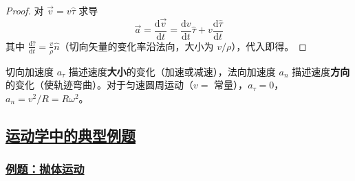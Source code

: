 \begin{proof}
    对 $\vec{v} = v\hat{\tau}$ 求导
    \begin{equation}
        \vec{a} = \frac{\mathrm{d}\vec{v}}{\mathrm{d}t} = \frac{\mathrm{d}v}{\mathrm{d}t}\hat{\tau} + v\frac{\mathrm{d}\hat{\tau}}{\mathrm{d}t}
    \end{equation}
    其中 $\frac{\mathrm{d}\hat{\tau}}{\mathrm{d}t} = \frac{v}{\rho}\hat{n}$（切向矢量的变化率沿法向，大小为 $v/\rho$），代入即得。
\end{proof}

\begin{remark}
    切向加速度 $a_\tau$ 描述速度\textbf{大小}的变化（加速或减速），法向加速度 $a_n$ 描述速度\textbf{方向}的变化（使轨迹弯曲）。对于匀速圆周运动（$v = $ 常量），$a_\tau = 0$，$a_n = v^2/R = R\omega^2$。
\end{remark}

\subsection{\protect\hyperlink{:}{运动学中的典型例题}}

\subsubsection{\protect\hyperlink{:}{例题：抛体运动}}

